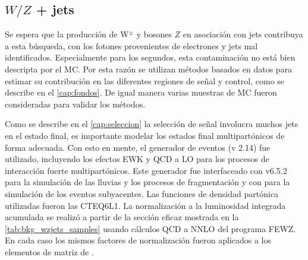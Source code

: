\begin{table}[!htbp]
\begin{tabular}{lccccc}
  \end{tabular}
  \label{tab:bkg_wzgamma_samples}
\end{table}


\subsection{$W/Z$ + jets}
\label{mc_wzjets}

Se espera que la producción de W$^{\pm}$ y bosones $Z$ en asociación con jets
contribuya a esta búsqueda, con los fotones provenientes de electrones y jets
mal identificados. Especialmente para los segundos, esta contaminación no está
bien descripta por el MC. Por esta razón se utilizan métodos basados en datos
para estimar su contribución en las diferentes regiones de señal y control, como
se describe en el \cref{cap:fondos}. De igual manera varias muestras de MC
fueron consideradas para validar los métodos.

Como se describe en el \cref{cap:seleccion} la selección de señal involucra
muchos jets en el estado final, es importante modelar los estados final
multipartónicos de forma adecuada. Con esto en mente, el generador de eventos
{\alpgen} (v 2.14) fue utilizado, incluyendo los efectos EWK y QCD a LO para los
procesos de interacción fuerte multipartónicos. Este generador fue interfaceado
con {\herwig} v6.5.2 para la simulación de las lluvias y los procesos de
fragmentación y con {\jimmy} para la simulación de los eventos subyacentes. Las
funciones de densidad partónica utilizadas fueron las CTEQ6L1. La normalización
a la luminosidad integrada acumulada se realizó a partir de la sección eficaz
mostrada en la \cref{tab:bkg_wzjets_samples} usando cálculos QCD a NNLO del
programa FEWZ\cite{Anastasiou:2003ds}. En cada caso los mismos factores de
normalización fueron aplicados a los elementos de matriz de {\alpgen}.

